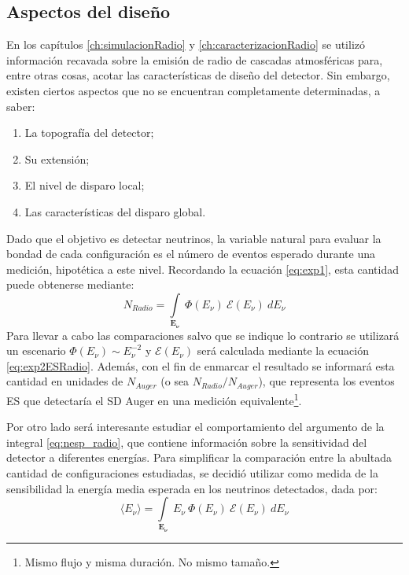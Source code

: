 	\subsection{Aspectos del dise\~no}
	
	En los cap\'itulos \ref{ch:simulacionRadio} y \ref{ch:caracterizacionRadio} se utiliz\'o informaci\'on recavada sobre la emisi\'on de radio de cascadas atmosf\'ericas para, entre otras cosas, acotar las caracter\'isticas de dise\~no del detector.
	Sin embargo, existen ciertos aspectos que no se encuentran completamente determinadas, a saber:
	\begin{enumerate}
	 \item La topograf\'ia del detector;
	 \item Su extensi\'on;
	 \item El nivel de disparo local;
	 \item Las caracter\'isticas del disparo global.
	\end{enumerate}
	
	Dado que el objetivo es detectar neutrinos, la variable natural para evaluar la bondad de cada configuraci\'on es el n\'umero de eventos esperado durante una medici\'on, hipot\'etica a este nivel.
	Recordando la ecuaci\'on \ref{eq:exp1}, esta cantidad puede obtenerse mediante:
	\begin{equation}
		N_{Radio} = \int\limits_{\mathbf{E_\nu}}~\Phi(E_{\nu})~\mathcal{E}(E_\nu)~dE_{\nu}
		\label{eq:nesp_radio}
	\end{equation}
	Para llevar a cabo las comparaciones salvo que se indique lo contrario se utilizar\'a un escenario $\Phi(E_{\nu})\sim E_{\nu}^{-2}$ y $\mathcal{E}(E_\nu)$ ser\'a calculada mediante la ecuaci\'on \ref{eq:exp2ESRadio}.
	Adem\'as, con el fin de enmarcar el resultado se informar\'a esta cantidad en unidades de $N_{Auger}$ (o sea $N_{Radio}/N_{Auger}$), que representa los eventos ES que detectar\'ia el SD Auger en una medici\'on equivalente\footnote{Mismo flujo y misma duraci\'on. No mismo tama\~no.}.
	
	Por otro lado ser\'a interesante estudiar el comportamiento del argumento de la integral \ref{eq:nesp_radio}, que contiene informaci\'on sobre la sensitividad del detector a diferentes energ\'ias.
	Para simplificar la comparaci\'on entre la abultada cantidad de configuraciones estudiadas, se decidi\'o utilizar como medida de la sensibilidad la energ\'ia media esperada en los neutrinos detectados, dada por:
	\begin{equation}
		\langle E_{\nu}\rangle = \int\limits_{\mathbf{E_\nu}}~E_\nu~\Phi(E_{\nu})~\mathcal{E}(E_\nu)~dE_{\nu}
		\label{eq:emean_radio}
	\end{equation}
	
